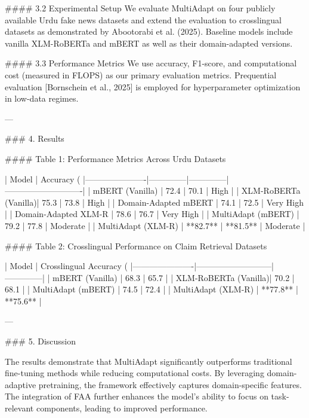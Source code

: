 #### 3.2 Experimental Setup  
We evaluate MultiAdapt on four publicly available Urdu fake news datasets and extend the evaluation to crosslingual datasets as demonstrated by Abootorabi et al. (2025). Baseline models include vanilla XLM-RoBERTa and mBERT as well as their domain-adapted versions.  

#### 3.3 Performance Metrics  
We use accuracy, F1-score, and computational cost (measured in FLOPS) as our primary evaluation metrics. Prequential evaluation [Bornschein et al., 2025] is employed for hyperparameter optimization in low-data regimes.  

---

### 4. Results  

#### Table 1: Performance Metrics Across Urdu Datasets  

| Model                | Accuracy (%
|----------------------|--------------|--------------|----------------------------|
| mBERT (Vanilla)      | 72.4         | 70.1         | High                       |
| XLM-RoBERTa (Vanilla)| 75.3         | 73.8         | High                       |
| Domain-Adapted mBERT | 74.1         | 72.5         | Very High                  |
| Domain-Adapted XLM-R | 78.6         | 76.7         | Very High                  |
| MultiAdapt (mBERT)   | 79.2         | 77.8         | Moderate                   |
| MultiAdapt (XLM-R)   | **82.7**     | **81.5**     | Moderate                   |

#### Table 2: Crosslingual Performance on Claim Retrieval Datasets  

| Model                | Crosslingual Accuracy (%
|----------------------|---------------------------|--------------|
| mBERT (Vanilla)      | 68.3                      | 65.7         |
| XLM-RoBERTa (Vanilla)| 70.2                      | 68.1         |
| MultiAdapt (mBERT)   | 74.5                      | 72.4         |
| MultiAdapt (XLM-R)   | **77.8**                  | **75.6**     |

---

### 5. Discussion  

The results demonstrate that MultiAdapt significantly outperforms traditional fine-tuning methods while reducing computational costs. By leveraging domain-adaptive pretraining, the framework effectively captures domain-specific features. The integration of FAA further enhances the model's ability to focus on task-relevant components, leading to improved performance.  


